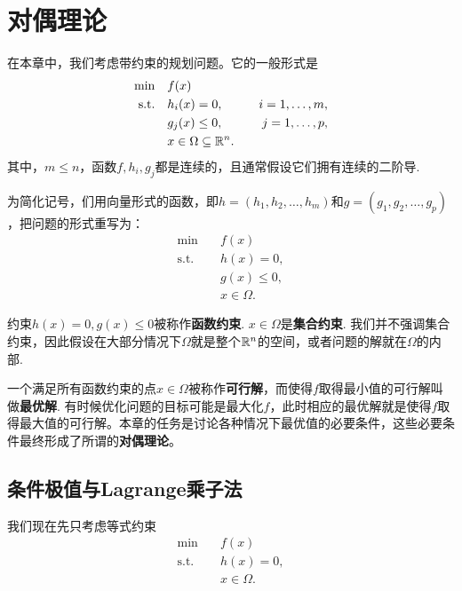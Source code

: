 \chapter{对偶理论}\label{chap:duality}
\begingroup
\newcommand{\pref}{Chapters/duality/figures}


在本章中，我们考虑带约束的规划问题。它的一般形式是
        \begin{alignat*}{2}
        \min\quad&f({x}) \\
        \text{s.t.}\quad&h_i({x})=0,&\quad i=1,\dots,m,\\
        &g_j(x)\leq 0,&\quad j=1,\dots,p,\\
        &x\in\Omega\subseteq\mathbb{R}^n.
        \end{alignat*}
其中，$m\le n$，函数$f,h_i,g_j$都是连续的，且通常假设它们拥有连续的二阶导. 

为简化记号，们用向量形式的函数，即${h}=(h_1,h_2,\dots,h_m)$和${g}=(g_1,g_2,\dots,g_p)$，把问题的形式重写为：
    \begin{align*}
        \min\quad& f({x}) \\
        \text{s.t.}\quad& {h}({x})={0},\\
        & {g}({x})\le {0}, \\
        & {x} \in \Omega.
    \end{align*}

约束${h}({x})={0},{g}({x})\le{0}$被称作\textbf{函数约束}. ${x}\in\Omega$是\textbf{集合约束}. 我们并不强调集合约束，因此假设在大部分情况下$\Omega$就是整个$\mathbb{R}^n$的空间，或者问题的解就在$\Omega$的内部. 

一个满足所有函数约束的点${x}\in\Omega$被称作\textbf{可行解}，而使得$f$取得最小值的可行解叫做\textbf{最优解}. 有时候优化问题的目标可能是最大化$f$，此时相应的最优解就是使得$f$取得最大值的可行解。本章的任务是讨论各种情况下最优值的必要条件，这些必要条件最终形成了所谓的\textbf{对偶理论}。

\section{条件极值与Lagrange乘子法}
我们现在先只考虑等式约束
\begin{equation}
\begin{aligned}
        \min\quad& f({x}) \\
        \text{s.t.}\quad& {h}({x})={0},\\
        & {x} \in \Omega.
\end{aligned}    \label{eq:eq-constraint-only-differentiable}
\end{equation}

